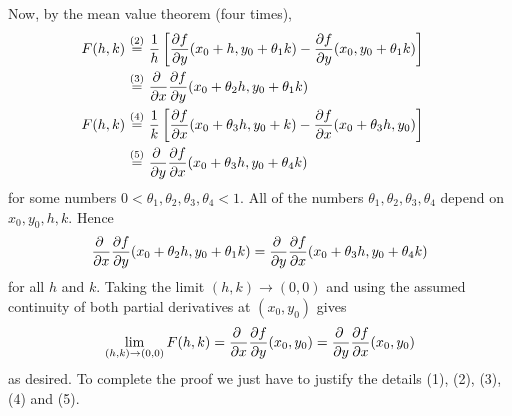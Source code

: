 Now, by the mean value theorem (four times),
\begin{align*}
F(h,k)\ &\eqf{(2)}\ \frac{1}{h}
\left[\pdiff{f}{y}(x_0+h,y_0+\theta_1k)
-\pdiff{f}{y}(x_0,y_0+\theta_1k)\right]\cr
\ &\eqf{(3)}\ \pdiff{}{x}
\pdiff{f}{y}(x_0+\theta_2 h,y_0+\theta_1k)\cr
F(h,k)\ &\eqf{(4)}\ \frac{1}{k}
\left[\pdiff{f}{x}(x_0+\theta_3h,y_0+k)
-\pdiff{f}{x}(x_0+\theta_3h,y_0)\right]\cr
\ &\eqf{(5)}\ \pdiff{}{y}
\pdiff{f}{x}(x_0+\theta_3 h,y_0+\theta_4k)\cr
\end{align*}
for some numbers $0<\theta_1,\theta_2,\theta_3,\theta_4<1$.
All of the numbers $\theta_1,\theta_2,\theta_3,\theta_4$ depend 
on $x_0,y_0,h,k$. Hence
\begin{equation*}
\pdiff{}{x}
\pdiff{f}{y}(x_0+\theta_2 h,y_0+\theta_1k)
=\pdiff{}{y}
\pdiff{f}{x}(x_0+\theta_3 h,y_0+\theta_4k)
\end{equation*}
for all $h$ and $k$. Taking the limit $(h,k)\rightarrow(0,0)$ and using
the assumed continuity of both partial derivatives at $(x_0,y_0)$ gives
\begin{equation*}
\lim_{(h,k)\rightarrow (0,0)} F(h,k)
=\pdiff{}{x}
\pdiff{f}{y}(x_0,y_0)
=\pdiff{}{y}
\pdiff{f}{x}(x_0,y_0)
\end{equation*}
as desired. To complete the proof we just have to justify the details
(1), (2), (3), (4) and (5).

